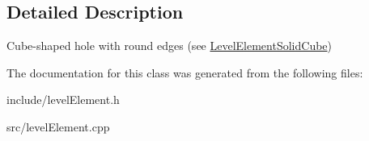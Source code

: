 \subsection{\-Detailed \-Description}
\-Cube-\/shaped hole with round edges (see \hyperlink{classLevelElementSolidCube}{\-Level\-Element\-Solid\-Cube}) 

\-The documentation for this class was generated from the following files\-:\begin{DoxyCompactItemize}
\item 
include/level\-Element.\-h\item 
src/level\-Element.\-cpp\end{DoxyCompactItemize}
